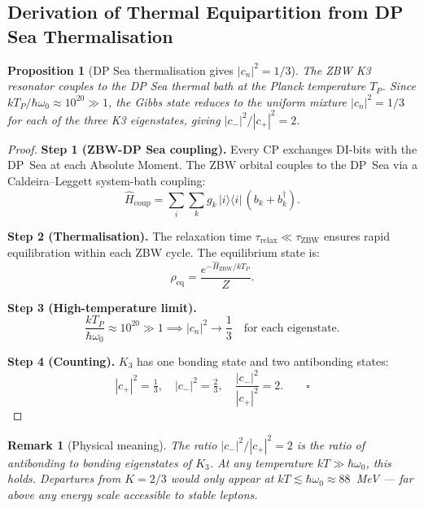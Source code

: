 \documentclass[11pt]{article}
\newtheorem{remark}{Remark}[section]
\newtheorem{proposition}[theorem]{Proposition}
\newcommand{\ZBW}{\mathrm{ZBW}}
\begin{document}
\subsection*{Derivation of Thermal Equipartition from DP Sea Thermalisation}
\label{prop:P3_derivation}

\begin{proposition}[DP Sea thermalisation gives $|c_n|^2 = 1/3$]
\label{prop:equip_derived}
The ZBW K3 resonator couples to the DP Sea thermal bath at the Planck
temperature $T_P$.  Since $kT_P/\hbar\omega_0 \approx 10^{20} \gg 1$,
the Gibbs state reduces to the uniform mixture $|c_n|^2 = 1/3$
for each of the three K3 eigenstates, giving $|c_-|^2/|c_+|^2 = 2$.
\end{proposition}

\begin{proof}
\textbf{Step 1 (ZBW-DP Sea coupling).}
Every CP exchanges DI-bits with the DP~Sea at each Absolute Moment.
The ZBW orbital couples to the DP~Sea via a Caldeira--Leggett
system-bath coupling:
\begin{equation}
\hat{H}_{\mathrm{coup}} = \sum_{i}\sum_k g_k\,|i\rangle\langle i|\,(b_k + b_k^\dagger).
\end{equation}

\textbf{Step 2 (Thermalisation).}
The relaxation time $\tau_{\mathrm{relax}} \ll \tau_{\mathrm{ZBW}}$
ensures rapid equilibration within each ZBW cycle.  The equilibrium
state is:
\begin{equation}
\rho_{\mathrm{eq}} = \frac{e^{-\hat{H}_\ZBW/kT_P}}{Z}.
\end{equation}

\textbf{Step 3 (High-temperature limit).}
\[
\frac{kT_P}{\hbar\omega_0} \approx 10^{20} \gg 1
\implies
|c_n|^2 \to \frac{1}{3} \quad\text{for each eigenstate}.
\]

\textbf{Step 4 (Counting).}
$K_3$ has one bonding state and two antibonding states:
\[
|c_+|^2 = \tfrac{1}{3}, \quad
|c_-|^2 = \tfrac{2}{3}, \quad
\frac{|c_-|^2}{|c_+|^2} = 2. \qquad\square
\]
\end{proof}

\begin{remark}[Physical meaning]
The ratio $|c_-|^2/|c_+|^2 = 2$ is the ratio of antibonding to bonding
eigenstates of $K_3$.  At any temperature $kT \gg \hbar\omega_0$, this
holds.  Departures from $K = 2/3$ would only appear at
$kT \lesssim \hbar\omega_0 \approx 88$~MeV --- far above any energy
scale accessible to stable leptons.
\end{remark}
\end{document}
